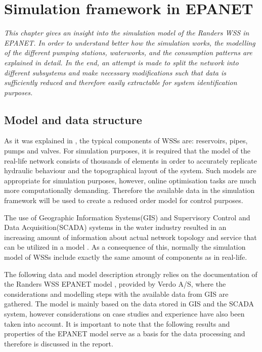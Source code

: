 \chapter{Simulation framework in EPANET}
\label{simulation_framework_in_EPANET}

\emph{This chapter gives an insight into the simulation model of the Randers WSS in EPANET. In order to understand better how the simulation works, the modelling of the different pumping stations, waterworks, and the consumption patterns are explained in detail. In the end, an attempt is made to split the network into different subsystems and make necessary modifications such that data is sufficiently reduced and therefore easily extractable for system identification purposes.}


\section{Model and data structure}
\label{model_data_and_structure}

As it was explained in , the typical components of WSSs are: reservoirs, pipes, pumps and valves. For simulation purposes, it is required that the model of the real-life network consists of thousands of elements in order to accurately replicate hydraulic behaviour and the topographical layout of the system. Such models are appropriate for simulation purposes, however, online optimisation tasks are much more computationally demanding. Therefore the available data in the simulation framework will be used to create a reduced order model for control purposes. 

The use of Geographic Information Systems(GIS) and Supervisory Control  and Data Acquisition(SCADA) systems in the water industry resulted in an increasing amount of information about actual network topology and service that can be utilized in a model \cite{johnson2016geographic}. As a consequence of this, normally the simulation model of WSSs include exactly the same amount of components as in real-life. 

The following data and model description strongly relies on the documentation of the Randers WSS EPANET model \cite{verdo_doc}, provided by Verdo A/S, where the considerations and modelling steps with the available data from GIS are gathered. The model is mainly based on the data stored in GIS and the SCADA system, however considerations on case studies and experience have also been taken into account. It is important to note that the following results and properties of the EPANET model serve as a basis for the data processing and therefore is discussed in the report.  

